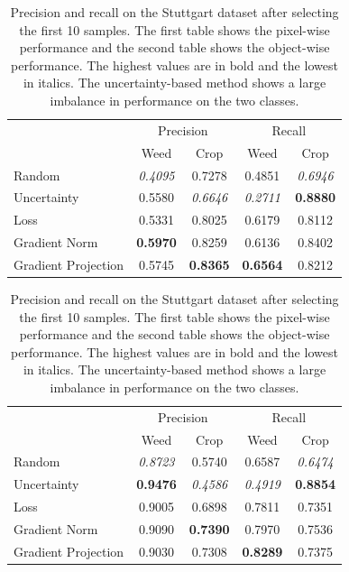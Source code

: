 \documentclass[letterpaper, 10 pt, conference]{ieeeconf}  %
\begin{document}
       \begin{table}
        \vspace{1em}
        \centering
      \caption{Precision and recall on the Stuttgart dataset after selecting the first 10 samples. The first table shows the pixel-wise performance and the second table shows the object-wise performance. The highest values are in bold and the lowest in italics. The uncertainty-based method shows a large imbalance in performance on the two classes.}
        \begin{tabular}{@{}lcccc@{}} 
            \toprule
            & \multicolumn{2}{c}{Precision} & \multicolumn{2}{c}{Recall}\\ 
           \cmidrule{2-5} 
               & Weed & Crop & Weed & Crop \\ 
            \midrule 
    		  Random & \textit{0.4095} & 0.7278 & 0.4851 & \textit{0.6946}  \\ \addlinespace
    		  Uncertainty & 0.5580 & \textit{0.6646} & \textit{0.2711} & \textbf{0.8880}  \\ \addlinespace
    		  Loss & 0.5331 & 0.8025 & 0.6179 & 0.8112  \\ \addlinespace
    		  Gradient Norm & \textbf{0.5970} & 0.8259 & 0.6136 & 0.8402  \\ \addlinespace
    		  Gradient Projection & 0.5745 & \textbf{0.8365} & \textbf{0.6564} & 0.8212  \\ 
            \bottomrule
        \end{tabular}
           \vspace{2em}
    
            \begin{tabular}{@{}lcccc@{}} 
            \toprule
            & \multicolumn{2}{c}{Precision} & \multicolumn{2}{c}{Recall}\\ 
           \cmidrule{2-5} 
               & Weed & Crop & Weed & Crop \\ 
            \midrule 
    		  Random & \textit{0.8723} & 0.5740 & 0.6587 & \textit{0.6474}  \\ \addlinespace
    		  Uncertainty & \textbf{0.9476} & \textit{0.4586} & \textit{0.4919} & \textbf{0.8854}  \\ \addlinespace
    		  Loss & 0.9005 & 0.6898 & 0.7811 & 0.7351  \\ \addlinespace
    		  Gradient Norm & 0.9090 & \textbf{0.7390} & 0.7970 & 0.7536  \\ \addlinespace
    		  Gradient Projection & 0.9030 & 0.7308 & \textbf{0.8289} & 0.7375  \\ 
            \bottomrule
        \end{tabular}
        \label{tab:performance_10_stuttgart}
    \end{table}
   
\end{document}
